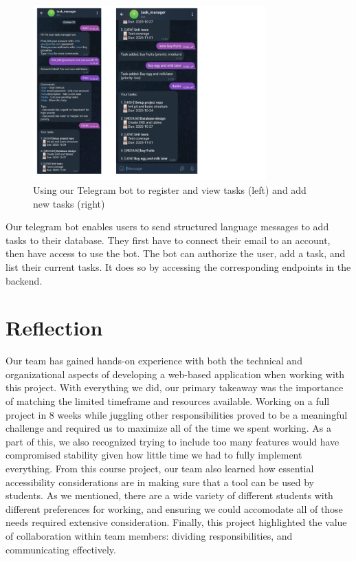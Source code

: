 \documentclass[11pt,oneside]{article}
\begin{document}
\begin{figure}[H]
    \centering
    \includegraphics[width=0.8\textwidth]{telegram_example.png}
    \caption{Using our Telegram bot to register and view tasks (left) and add new tasks (right)}
    \label{fig:telegram-example}
\end{figure}

Our telegram bot enables users to send structured language messages to add tasks to their database. They first have to connect their email to an account, then have access to use the bot. The bot can authorize the user, add a task, and list their current tasks. It does so by accessing the corresponding endpoints in the backend.

\section{Reflection}
Our team has gained hands-on experience with both the technical and organizational aspects of developing a web-based application when working with this project. With everything we did, our primary takeaway was the importance of matching the limited timeframe and resources available. Working on a full project in 8 weeks while juggling other responsibilities proved to be a meaningful challenge and required us to maximize all of the time we spent working. As a part of this, we also recognized trying to include too many features would have compromised stability given how little time we had to fully implement everything. From this course project, our team also learned how essential accessibility considerations are in making sure that a tool can be used by students. As we mentioned, there are a wide variety of different students with different preferences for working, and ensuring we could accomodate all of those needs required extensive consideration. Finally, this project highlighted the value of collaboration within team members: dividing responsibilities, and communicating effectively. 
\end{document}
